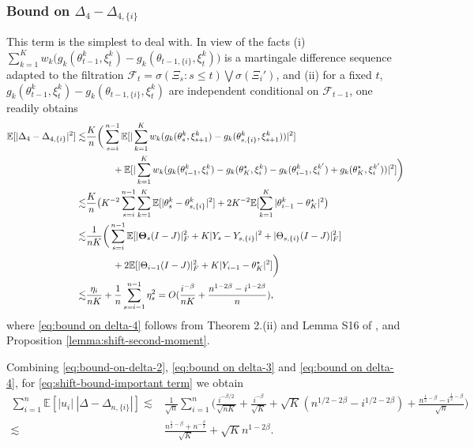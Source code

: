 \documentclass[a4paper,11pt]{article}
\numberwithin{equation}{section}
\theoremstyle{plain}
\theoremstyle{remark}
\def\IE{\mathbb{E}}
\def\bT{\mathbf{\Theta}}
\newcommand{\shift}[2]{#1_{#2, \{i\}}}
\newcommand{\minparam}{\theta^\star_K}
\begin{document}
\subsubsection{Bound on $\Delta_4 - \shift{\Delta}{4}$}
This term is the simplest to deal with. In view of the facts (i) $\sum_{k=1}^K w_k  \big( g_k(\theta_{t-1}^k, \xi_t^k) - g_k(\shift{\theta}{t-1}, \xi_t^k) \big)$ is a martingale difference sequence adapted to the filtration $\mathcal{F}_t=\sigma(\Xi_s: s\leq t) \bigvee \sigma(\Xi_i')$, and (ii) for a fixed $t$, $g_k(\theta_{t-1}^k, \xi_t^k) - g_k(\shift{\theta}{t-1}, \xi_t^k)$ are independent conditional on $\mathcal{F}_{t-1}$, one readily obtains
\begin{align}
    \IE[|\Delta_4 - \shift{\Delta}{4}|^2] \lesssim & {\frac{K}{n}} \bigg(\sum_{s=i}^{n-1} \IE[|\sum_{k=1}^K w_k(g_k(\theta_{s}^k, \xi_{s+1}^k) - g_k(\shift{\theta}{s}^k, \xi_{s+1}^k))|^2] \nonumber\\ & \hspace*{1cm}+ \IE[|\sum_{k=1}^K w_k(g_k(\theta_{i-1}^k, \xi_{i}^k) - g_k(\minparam, \xi_{i}^k) - g_k(\theta_{i-1}^k, \xi_{i}^{k'}) + g_k(\minparam, \xi_{i}^{k'}))|^2] \bigg) \nonumber\\
   \lesssim & \frac{K}{n} \big( K^{-2}\sum_{s=i}^{n-1}\sum_{k=1}^K \IE[|\theta_s^k - \shift{\theta}{s}^k|^2] +2 K^{-2}\IE[\sum_{k=1}^K|\theta_{i-1}^k - \minparam|^2 \big)\nonumber\\
   \lesssim &  \frac{1}{nK}\bigg(\sum_{s=i}^{n-1} \IE[|\bT_s(I-J)|_F^2 + K|Y_s - \shift{Y}{s}|^2 + |\shift{\Theta}{s}(I-J)|_F^2] \nonumber\\ & \hspace*{1cm}+ 2\IE[|\Theta_{i-1}(I-J)|_F^2 + K|Y_{i-1} - \minparam|^2]  \bigg)\nonumber\\
   \lesssim & \frac{\eta_i}{nK} +  \frac{1}{n} \sum_{s=i-1}^{n-1} \eta_s^2 = O(\frac{i^{-\beta}}{nK} + \frac{ n^{1-2\beta} - i^{1-2\beta}}{n}), \label{eq:bound on delta-4}
\end{align}
where \eqref{eq:bound on delta-4} follows from Theorem 2.(ii) and Lemma S16 of \cite{songxichen2024}, and Proposition \ref{lemma:shift-second-moment}. 
\noindent

Combining \eqref{eq:bound-on-delta-2}, \eqref{eq:bound on delta-3} and \eqref{eq:bound on delta-4}, for \eqref{eq:shift-bound-important term} we obtain
\begin{align}
    \sum_{i=1}^n \IE[|u_i| \  |\Delta- \shift{\Delta}{n}|]
    \lesssim & \frac{1}{\sqrt{n}} \sum_{i=1}^n\Big(\frac{i^{-\beta/2}}{\sqrt{nK}}+  \frac{i^{-\beta}}{\sqrt{K}} +  \sqrt{K}(n^{1/2-2\beta}- i^{1/2-2\beta})  + \frac{n^{\frac{1}{2}-\beta} - i^{\frac{1}{2}-\beta}}{\sqrt{n}} \Big) \nonumber\\
    \lesssim & \frac{n^{\frac{1}{2} -\beta} + n^{-\frac{\beta}{2}}}{\sqrt{K}} + \sqrt{K}n^{1-2\beta}. \label{eq: bound-on-coupled-terms}
\end{align}
\end{document}
